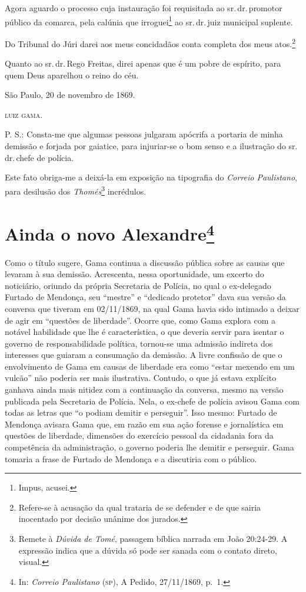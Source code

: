 Agora aguardo o processo cuja instauração foi requisitada ao sr.\,dr.\,promotor público da comarca, pela calúnia que irroguei\footnote{Impus,
  acusei.} ao sr.\,dr.\,juiz municipal suplente.

Do Tribunal do Júri darei aos meus concidadãos conta completa dos meus
atos.\footnote{Refere-se à acusação da qual trataria de se defender e
  de que sairia inocentado por decisão unânime dos jurados.}

Quanto ao sr.\,dr.\,Rego Freitas, direi apenas que é um pobre de espírito,
para quem Deus aparelhou o reino do céu.
\begin{flushright}
São Paulo, 20 de novembro de 1869.

\textsc{luiz gama}.
\end{flushright}
P. S.: Consta-me que algumas pessoas julgaram apócrifa a portaria de
minha demissão e forjada por gaiatice, para injuriar-se o bom senso e a
ilustração do sr.\,dr.\,chefe de polícia.

Este fato obriga-me a deixá-la em exposição na tipografia do
\emph{Correio Paulistano}, para desilusão dos \emph{Thomés}\footnote{
  Remete à \emph{Dúvida de Tomé}, passagem bíblica narrada em João
  20:24-29. A expressão indica que a dúvida só pode ser sanada com o
  contato direto, visual.} incrédulos.

\chapter{Ainda o novo Alexandre\footnote{In: \emph{Correio Paulistano}
  (\textsc{sp}), A Pedido, 27/11/1869, p.~1.}}

\begin{didascalia}
Como o título sugere, Gama continua a discussão pública sobre as causas
que levaram à sua demissão. Acrescenta, nessa oportunidade, um excerto
do noticiário, oriundo da própria Secretaria de Polícia, no qual o
ex-delegado Furtado de Mendonça, seu ``mestre'' e ``dedicado protetor'' dava
sua versão da conversa que tiveram em 02/11/1869, na qual Gama havia
sido intimado a deixar de agir em ``questões de liberdade''. Ocorre que,
como Gama explora com a notável habilidade que lhe é característica, o
que deveria servir para isentar o governo de responsabilidade política,
tornou-se uma admissão indireta dos interesses que guiaram a consumação
da demissão. A livre confissão de que o envolvimento de Gama em causas
de liberdade era como ``estar mexendo em um vulcão'' não poderia ser mais
ilustrativa. Contudo, o que já estava explícito ganhava ainda mais
nitidez com a continuação da conversa, mesmo na versão publicada pela
Secretaria de Polícia. Nela, o ex-chefe de polícia avisou Gama com todas
as letras que ``o podiam demitir e perseguir''. Isso mesmo: Furtado de
Mendonça avisara Gama que, em razão em sua ação forense e jornalística
em questões de liberdade, dimensões do exercício pessoal da cidadania
fora da competência da administração, o governo poderia lhe demitir e
perseguir. Gama tomaria a frase de Furtado de Mendonça e a discutiria
com o público.
\end{didascalia}



